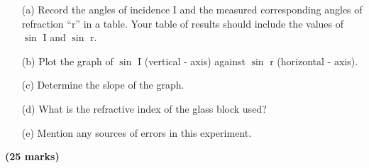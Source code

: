 \begin{enumerate}
\begin{itemize}
\item[(a)] Record the angles of incidence I and the measured corresponding angles of refraction ``r'' in a table. Your table of results should include the values of $\sin$ I and $\sin$ r.
\item[(b)] Plot the graph of $\sin$ I (vertical - axis) against $\sin$ r (horizontal - axis).
\item[(c)] Determine the slope of the graph.
\item[(d)] What is the refractive index of the glass block used?
\item[(e)] Mention any sources of errors in this experiment.
\end{itemize}

\end{enumerate}
\flushright \textbf{(25 marks)}


